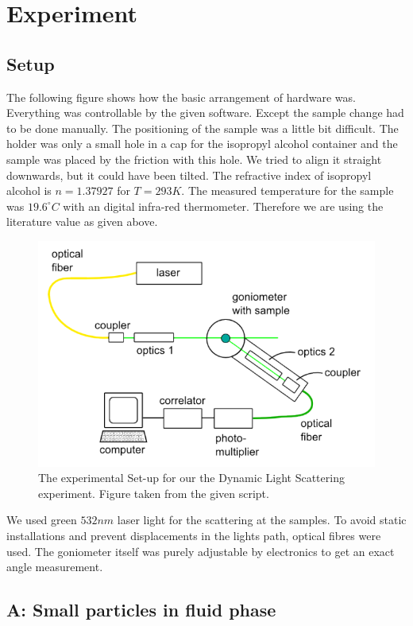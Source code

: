 \documentclass[]{article}
\begin{document}
\newpage
\section{Experiment}
\subsection{Setup}
The following figure shows how the basic arrangement of hardware was. Everything was controllable by the given software. Except the sample change had to be done manually. The positioning of the sample was a little bit difficult. The holder was only a small hole in a cap for the isopropyl alcohol container and the sample was placed by the friction with this hole. We tried to align it straight downwards, but it could have been tilted. The refractive index of isopropyl alcohol is $n=1.37927$ for $T=293K$. The measured temperature for the sample was $19.6 ^\circ C$ with an digital infra-red thermometer. Therefore we are using the literature value as given above.

\begin{figure}[!htbp]
\centering
\includegraphics[width=0.8\linewidth]{Plots/Setup.png}
\caption{The experimental Set-up for our the Dynamic Light Scattering experiment. Figure taken from the given script.}
\end{figure}

We used green $532nm$ laser light for the scattering at the samples. To avoid static installations and prevent displacements in the lights path, optical fibres were used. The goniometer itself was purely adjustable by electronics to get an exact angle measurement.


\subsection{A: Small particles in fluid phase}
\end{document}
